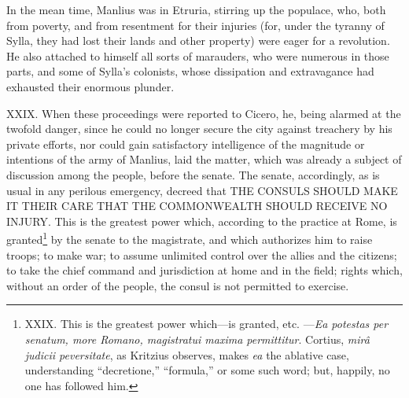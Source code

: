 In the mean time, Manlius was in Etruria, stirring up the populace,
who, both from poverty, and from resentment for their injuries (for,
under the tyranny of Sylla, they had lost their lands and other
property) were eager for a revolution. He also attached to himself all
sorts of marauders, who were numerous in those parts, and some of
Sylla's colonists, whose dissipation and extravagance had exhausted
their enormous plunder.

XXIX. When these proceedings were reported to Cicero, he, being
alarmed at the twofold danger, since he could no longer secure the
city against treachery by his private efforts, nor could gain
satisfactory intelligence of the magnitude or intentions of the army
of Manlius, laid the matter, which was already a subject of discussion
among the people, before the senate. The senate, accordingly, as is
usual in any perilous emergency, decreed that THE CONSULS SHOULD MAKE
IT THEIR CARE THAT THE COMMONWEALTH SHOULD RECEIVE NO INJURY. This is
the greatest power which, according to the practice at Rome, is
granted\footnote{XXIX. This is the greatest power which—is granted, etc.
—\emph{Ea potestas per senatum, more Romano, magistratui maxima
permittitur}. Cortius, \emph{mirâ judicii peversitate}, as Kritzius
observes, makes \emph{ea} the ablative case, understanding ``decretione,''
``formula,'' or some such word; but, happily, no one has followed him.} by the senate to the magistrate, and which authorizes him
to raise troops; to make war; to assume unlimited control over the
allies and the citizens; to take the chief command and jurisdiction at
home and in the field; rights which, without an order of the people,
the consul is not permitted to exercise.

